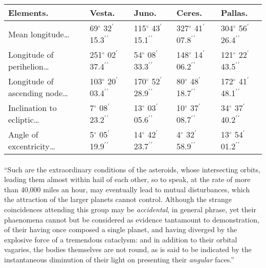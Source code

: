 \documentclass[a4paper, 12pt, oneside]{article}
\begin{document}
\begin{table}[!ht]
    \centering
    \footnotesize
    \begin{tabular}{|p{20mm}|l|l|l|l|}
    \hline
         Elements. & Vesta. & Juno. & Ceres. & Pallas. \\ \hline
        Mean longitude… & 69$^\circ$ 32$^\prime$ 15.3$^\prime$$^\prime$ & 115$^\circ$ 43$^\prime$ 15.1$^\prime$$^\prime$ & 327$^\circ$ 41$^\prime$ 07.8$^\prime$$^\prime$ & 304$^\circ$ 56$^\prime$ 26.4$^\prime$$^\prime$ \\ \hline
        Longitude of perihelion… & 251$^\circ$ 02$^\prime$ 37.4$^\prime$$^\prime$ & 54$^\circ$ 08$^\prime$ 33.3$^\prime$$^\prime$ & 148$^\circ$ 14$^\prime$ 06.2$^\prime$$^\prime$ & 121$^\circ$ 22$^\prime$ 43.5$^\prime$$^\prime$ \\ \hline
        Longitude of ascending node… & 103$^\circ$ 20$^\prime$ 03.4$^\prime$$^\prime$ & 170$^\circ$ 52$^\prime$ 28.9$^\prime$$^\prime$ & 80$^\circ$ 48$^\prime$ 18.7$^\prime$$^\prime$ & 172$^\circ$ 41$^\prime$ 48.1$^\prime$$^\prime$ \\ \hline
        Inclination to ecliptic… & 7$^\circ$ 08$^\prime$ 23.2$^\prime$$^\prime$ & 13$^\circ$ 03$^\prime$ 05.6$^\prime$$^\prime$ & 10$^\circ$ 37$^\prime$ 08.7$^\prime$$^\prime$ & 34$^\circ$ 37$^\prime$ 40.2$^\prime$$^\prime$ \\ \hline
        Angle of excentricity… & 5$^\circ$ 05$^\prime$ 19.9$^\prime$$^\prime$ & 14$^\circ$ 42$^\prime$ 23.7$^\prime$$^\prime$ & 4$^\circ$ 32$^\prime$ 58.9$^\prime$$^\prime$ & 13$^\circ$ 54$^\prime$ 01.2$^\prime$$^\prime$ \\ \hline
    \end{tabular}
\end{table}
\paragraph{}
``Such are the extraordinary conditions of the asteroids, whose intersecting orbits, leading them almost within hail of each other, so to speak, at the rate of more than 40,000 miles an hour, may eventually lead to mutual disturbances, which the attraction of the larger planets cannot control. Although the strange coincidences attending this group may be \emph{accidental}, in general phrase, yet their phaenomena cannot but be considered as evidence tantamount to demonstration, of their having once composed a single planet, and having diverged by the explosive force of a tremendous cataclysm: and in addition to their orbital vagaries, the bodies themselves are not round, as is said to be indicated by the instantaneous diminution of their light on presenting their \emph{angular} faces.''
\end{document}
